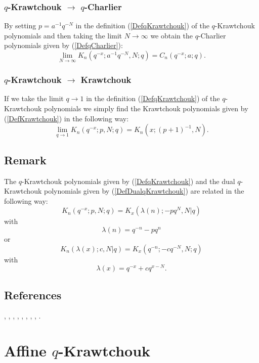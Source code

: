 \documentclass[envcountchap,graybox]{svmono}
\begin{document}
\subsubsection*{$q$-Krawtchouk $\rightarrow$ $q$-Charlier}
By setting $p=a^{-1}q^{-N}$ in the definition (\ref{DefqKrawtchouk}) of the
$q$-Krawtchouk polynomials and then taking the limit $N\rightarrow\infty$ we
obtain the $q$-Charlier polynomials given by (\ref{DefqCharlier}):
\begin{equation}
\lim_{N\rightarrow\infty}K_n(q^{-x};a^{-1}q^{-N},N;q)=C_n(q^{-x};a;q).
\end{equation}

\subsubsection*{$q$-Krawtchouk $\rightarrow$ Krawtchouk}
If we take the limit $q\rightarrow 1$ in the definition (\ref{DefqKrawtchouk}) of the $q$-Krawtchouk
polynomials we simply find the Krawtchouk polynomials given by (\ref{DefKrawtchouk}) in the
following way:
\begin{equation}
\lim_{q\rightarrow 1}K_n(q^{-x};p,N;q)=K_n(x;(p+1)^{-1},N).
\end{equation}

\subsection*{Remark}
The $q$-Krawtchouk polynomials given by (\ref{DefqKrawtchouk}) and the
dual $q$-Krawtchouk polynomials given by (\ref{DefDualqKrawtchouk}) are
related in the following way:
$$K_n(q^{-x};p,N;q)=K_x(\lambda(n);-pq^N,N|q)$$
with
$$\lambda(n)=q^{-n}-pq^n$$
or
$$K_n(\lambda(x);c,N|q)=K_x(q^{-n};-cq^{-N},N;q)$$
with
$$\lambda(x)=q^{-x}+cq^{x-N}.$$

\subsection*{References}
\cite{AlvarezRonveaux}, \cite{AskeyWilson79}, \cite{AtakRahmanSuslov},
\cite{Campigotto+}, \cite{GasperRahman90}, \cite{Nikiforov+},
\cite{NoumiMimachi91}, \cite{Stanton80III}, \cite{Stanton84}.


\newpage

\section{Affine $q$-Krawtchouk}
\par\setcounter{equation}{0}
\end{document}
